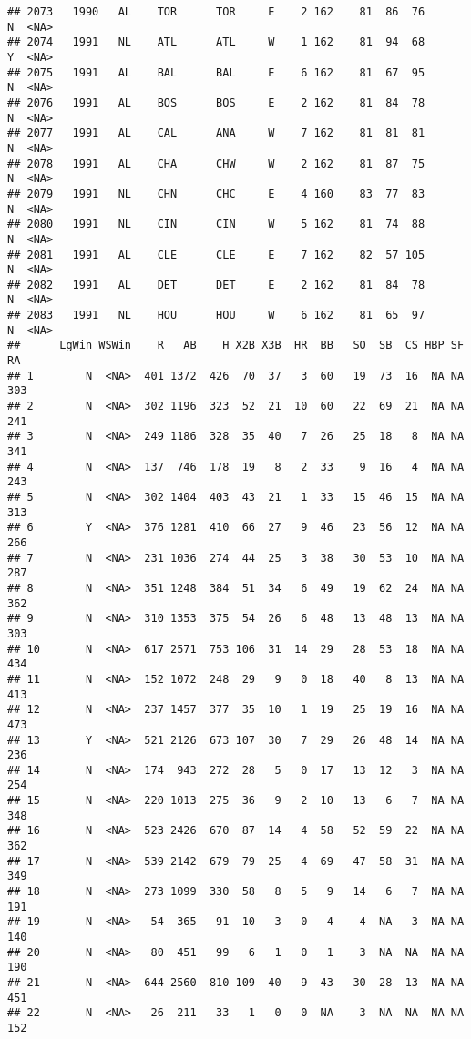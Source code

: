 \documentclass[]{article}
\begin{document}
\begin{verbatim}
## 2073   1990   AL    TOR      TOR     E    2 162    81  86  76      N  <NA>
## 2074   1991   NL    ATL      ATL     W    1 162    81  94  68      Y  <NA>
## 2075   1991   AL    BAL      BAL     E    6 162    81  67  95      N  <NA>
## 2076   1991   AL    BOS      BOS     E    2 162    81  84  78      N  <NA>
## 2077   1991   AL    CAL      ANA     W    7 162    81  81  81      N  <NA>
## 2078   1991   AL    CHA      CHW     W    2 162    81  87  75      N  <NA>
## 2079   1991   NL    CHN      CHC     E    4 160    83  77  83      N  <NA>
## 2080   1991   NL    CIN      CIN     W    5 162    81  74  88      N  <NA>
## 2081   1991   AL    CLE      CLE     E    7 162    82  57 105      N  <NA>
## 2082   1991   AL    DET      DET     E    2 162    81  84  78      N  <NA>
## 2083   1991   NL    HOU      HOU     W    6 162    81  65  97      N  <NA>
##      LgWin WSWin    R   AB    H X2B X3B  HR  BB   SO  SB  CS HBP SF   RA
## 1        N  <NA>  401 1372  426  70  37   3  60   19  73  16  NA NA  303
## 2        N  <NA>  302 1196  323  52  21  10  60   22  69  21  NA NA  241
## 3        N  <NA>  249 1186  328  35  40   7  26   25  18   8  NA NA  341
## 4        N  <NA>  137  746  178  19   8   2  33    9  16   4  NA NA  243
## 5        N  <NA>  302 1404  403  43  21   1  33   15  46  15  NA NA  313
## 6        Y  <NA>  376 1281  410  66  27   9  46   23  56  12  NA NA  266
## 7        N  <NA>  231 1036  274  44  25   3  38   30  53  10  NA NA  287
## 8        N  <NA>  351 1248  384  51  34   6  49   19  62  24  NA NA  362
## 9        N  <NA>  310 1353  375  54  26   6  48   13  48  13  NA NA  303
## 10       N  <NA>  617 2571  753 106  31  14  29   28  53  18  NA NA  434
## 11       N  <NA>  152 1072  248  29   9   0  18   40   8  13  NA NA  413
## 12       N  <NA>  237 1457  377  35  10   1  19   25  19  16  NA NA  473
## 13       Y  <NA>  521 2126  673 107  30   7  29   26  48  14  NA NA  236
## 14       N  <NA>  174  943  272  28   5   0  17   13  12   3  NA NA  254
## 15       N  <NA>  220 1013  275  36   9   2  10   13   6   7  NA NA  348
## 16       N  <NA>  523 2426  670  87  14   4  58   52  59  22  NA NA  362
## 17       N  <NA>  539 2142  679  79  25   4  69   47  58  31  NA NA  349
## 18       N  <NA>  273 1099  330  58   8   5   9   14   6   7  NA NA  191
## 19       N  <NA>   54  365   91  10   3   0   4    4  NA   3  NA NA  140
## 20       N  <NA>   80  451   99   6   1   0   1    3  NA  NA  NA NA  190
## 21       N  <NA>  644 2560  810 109  40   9  43   30  28  13  NA NA  451
## 22       N  <NA>   26  211   33   1   0   0  NA    3  NA  NA  NA NA  152

\end{verbatim}
\end{document}
